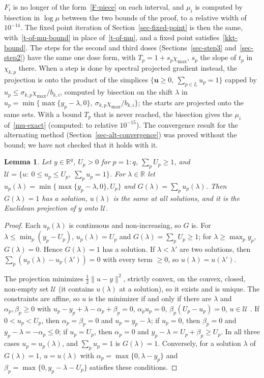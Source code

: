 \documentclass[11pt]{article}
\theoremstyle{plain}
\newtheorem{lemma}[theorem]{Lemma}
\theoremstyle{remark}
\numberwithin{equation}{section}
\begin{document}
$F_i$ is no longer of the form~\eqref{F-piece} on each interval, and $\mu_i$ is
computed by bisection in $\log\mu$ between the two bounds of the proof, to a
relative width of $10^{-14}$. The fixed point iteration of
Section~\ref{sec-fixed-point} is then the same, with~\eqref{t-of-mu-bound}
in place of~\eqref{t-of-mu}, and a fixed point satisfies~\eqref{kkt-bound}. The
steps for the second and third doses (Sections~\ref{sec-step3}
and~\ref{sec-step2}) have the same one dose form, with $T_p=1+s_p\chi_{\max}$, $s_p$
the slope of $t_p$ in $\chi_{k,p}$ there. When a step is done by spectral
projected gradient instead, the projection is onto the product of the simplices
$\{\bm u\ge0,\ \sum_{p\in I_i}u_p=1\}$ capped by $u_p\le\sigma_{k,p}\chi_{\max}/b_{k,i}$,
computed by bisection on the shift $\lambda$ in $u_p=\min\{\max\{y_p-\lambda,0\},\
\sigma_{k,p}\chi_{\max}/b_{k,i}\}$; the starts are projected onto the same sets.
With a bound $T_p$ that is never reached, the bisection gives the $\mu_i$
of~\eqref{mu-exact} (computed: to relative $10^{-15}$). The convergence result for
the alternating method (Section~\ref{sec-alt-convergence}) was proved without
the bound; we have not checked that it holds with it.

\begin{lemma}\label{lem-capped-proj}
Let $y\in\mathbb R^q$, $U_p>0$ for $p=1:q$, $\sum_pU_p\ge1$, and
$\mathcal U=\{u:\ 0\le u_p\le U_p,\ \sum_pu_p=1\}$. For $\lambda\in\mathbb R$ let
$u_p(\lambda)=\min\{\max\{y_p-\lambda,0\},U_p\}$ and $G(\lambda)=\sum_pu_p(\lambda)$.
Then $G(\lambda)=1$ has a solution, $u(\lambda)$ is the same at all solutions, and it
is the Euclidean projection of $y$ onto $\mathcal U$.
\end{lemma}
\begin{proof}
Each $u_p(\lambda)$ is continuous and non-increasing, so $G$ is. For
$\lambda\le\min_p(y_p-U_p)$, $u_p(\lambda)=U_p$ and $G(\lambda)=\sum_pU_p\ge1$; for
$\lambda\ge\max_py_p$, $G(\lambda)=0$. Hence $G(\lambda)=1$ has a solution. If
$\lambda<\lambda'$ are two solutions, then $\sum_p\left(u_p(\lambda)-u_p(\lambda')\right)=0$
with every term $\ge0$, so $u(\lambda)=u(\lambda')$.

The projection minimizes $\frac12\|u-y\|^2$, strictly convex, on the convex, closed,
non-empty set $\mathcal U$ (it contains $u(\lambda)$ at a solution), so it exists and
is unique. The constraints are affine, so $u$ is the minimizer if and only if there
are $\lambda$ and $\alpha_p,\beta_p\ge0$ with
$u_p-y_p+\lambda-\alpha_p+\beta_p=0$, $\alpha_pu_p=0$, $\beta_p(U_p-u_p)=0$, $u\in\mathcal U$
\cite[Section~5.5.3]{2004Boyd_Vandenberghe}. If $0<u_p<U_p$, then
$\alpha_p=\beta_p=0$ and $u_p=y_p-\lambda$; if $u_p=0$, then $\beta_p=0$ and
$y_p-\lambda=-\alpha_p\le0$; if $u_p=U_p$, then $\alpha_p=0$ and
$y_p-\lambda=U_p+\beta_p\ge U_p$. In all three cases $u_p=u_p(\lambda)$, and
$\sum_pu_p=1$ is $G(\lambda)=1$. Conversely, for a solution $\lambda$ of
$G(\lambda)=1$, $u=u(\lambda)$ with $\alpha_p=\max\{0,\lambda-y_p\}$ and
$\beta_p=\max\{0,y_p-\lambda-U_p\}$ satisfies these conditions.
\end{proof}
\end{document}
